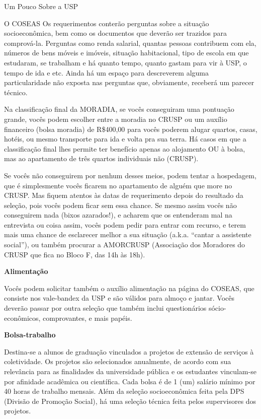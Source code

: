 \begin{secao}{Um Pouco Sobre a USP}
\begin{subsecao}{O COSEAS}
Os requerimentos conterão perguntas sobre a situação socioeconômica, bem como os
documentos que deverão ser trazidos para comprová-la. Perguntas como renda
salarial, quantas pessoas contribuem com ela, números de bens móveis e imóveis,
situação habitacional, tipo de escola em que estudaram, se trabalham e há quanto
tempo, quanto gastam para vir à USP, o tempo de ida e etc. Ainda há um espaço
para descreverem alguma particularidade não exposta nas perguntas que, obviamente,
receberá um parecer técnico.

Na classificação final da MORADIA, se vocês conseguiram uma pontuação grande, vocês
podem escolher entre a moradia no CRUSP ou um auxílio financeiro (bolsa moradia)
de R\$400,00 para vocês poderem alugar quartos, casas, hotéis, ou mesmo transporte
para ida e volta pra sua terra. Há casos em que a classificação final lhes
permite ter benefício apenas ao alojamento OU à bolsa, mas ao apartamento de
três quartos individuais não (CRUSP).

Se vocês não conseguirem por nenhum desses meios, podem tentar a hospedagem, que é
simplesmente vocês ficarem no apartamento de alguém que more no CRUSP. Mas fiquem
atentos às datas de requerimento depois do resultado da seleção, pois vocês podem
ficar sem essa chance. Se mesmo assim vocês não conseguirem nada (bixos azarados!),
e acharem que os entenderam mal na entrevista ou coisa assim, vocês podem pedir para
entrar com recurso, e terem mais uma chance de esclarecer melhor a sua situação
(a.k.a. “cantar a assistente social”), ou também procurar a
AMORCRUSP (Associação dos Moradores do CRUSP que fica no Bloco F, das 14h às 18h).

{\bf Alimentação}

Vocês podem solicitar também o auxílio alimentação na página do COSEAS, que
consiste nos vale-bandex da USP e são válidos para almoço e jantar. Vocês deverão
passar por outra seleção que também inclui questionários sócio-econômicos,
comprovantes, e mais papéis.

{\bf Bolsa-trabalho}

Destina-se a alunos de graduação vinculados a projetos de extensão de serviços à
coletividade. Os projetos são selecionados anualmente, de acordo com sua relevância
para as finalidades da universidade pública e os estudantes vinculam-se por
afinidade acadêmica ou científica. Cada bolsa é de 1 (um) salário mínimo por
40 horas de trabalho mensais. Além da seleção socioeconômica feita pela
DPS (Divisão de Promoção Social), há uma seleção técnica feita pelos supervisores
dos projetos.


\end{subsecao}
\end{secao}
